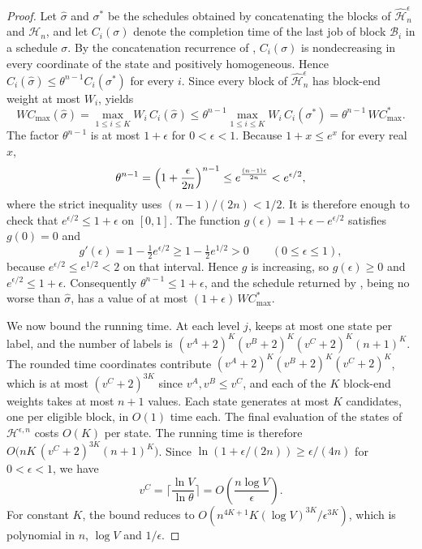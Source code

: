 \documentclass[12pt]{article}
\begin{document}
\begin{sloppypar}
\begin{proof}
Let $\hat\sigma$ and $\sigma^{*}$ be the schedules obtained by concatenating the blocks of
$\hat{\mathscr{H}}^{\epsilon}_{n}$ and $\mathscr{H}_{n}$, and let $C_i(\sigma)$ denote the completion
time of the last job of block $\mathcal{B}_i$ in a schedule $\sigma$. By the concatenation
recurrence of , $C_i(\sigma)$ is nondecreasing in every coordinate
of the state and positively homogeneous. Hence $C_i(\hat\sigma)\le\theta^{n-1}C_i(\sigma^{*})$ for
every $i$. Since every block of $\hat{\mathscr{H}}^{\epsilon}_{n}$ has block-end weight at most
$W_i$,  yields
\[
W C_{\max}(\hat\sigma)
=\max_{1\le i\le K}W_i\,C_i(\hat\sigma)
\le \theta^{n-1}\max_{1\le i\le K}W_i\,C_i(\sigma^{*})
=\theta^{n-1}\,W C_{\max}^{*}.
\]
The factor $\theta^{n-1}$ is at most $1+\epsilon$ for $0<\epsilon<1$. Because $1+x\le e^{x}$ for
every real $x$,
\[
\theta^{n-1}=\Bigl(1+\frac{\epsilon}{2n}\Bigr)^{n-1}
\le e^{\frac{(n-1)\epsilon}{2n}}
<e^{\epsilon/2},
\]
where the strict inequality uses $(n-1)/(2n)<1/2$. It is therefore enough to check that
$e^{\epsilon/2}\le1+\epsilon$ on $[0,1]$. The function $g(\epsilon)=1+\epsilon-e^{\epsilon/2}$
satisfies $g(0)=0$ and
\[
g'(\epsilon)=1-\tfrac12 e^{\epsilon/2}\ge 1-\tfrac12 e^{1/2}>0
\qquad(0\le\epsilon\le1),
\]
because $e^{\epsilon/2}\le e^{1/2}<2$ on that interval. Hence $g$ is increasing, so
$g(\epsilon)\ge0$ and $e^{\epsilon/2}\le1+\epsilon$. Consequently $\theta^{n-1}\le1+\epsilon$, and
the schedule returned by , being no worse than $\hat\sigma$, has a value of
at most $(1+\epsilon)\,W C_{\max}^{*}$.

We now bound the running time. At each level $j$,  keeps at most one state
per label, and the number of labels is $(v^{A}+2)^K(v^{B}+2)^K(v^{C}+2)^K(n+1)^K$. The rounded time
coordinates contribute $(v^{A}+2)^K(v^{B}+2)^K(v^{C}+2)^K$, which is at most $(v^{C}+2)^{3K}$ since
$v^{A},v^{B}\le v^{C}$, and each of the $K$ block-end weights takes at most $n+1$ values. Each
state generates at most $K$ candidates, one per eligible block, in $O(1)$ time each. The final
evaluation of the states of $\mathscr{H}^{\epsilon,n}$ costs $O(K)$ per state. The running time is
therefore $O\bigl(nK\,(v^{C}+2)^{3K}(n+1)^{K}\bigr)$. Since
$\ln(1+\epsilon/(2n))\ge\epsilon/(4n)$ for $0<\epsilon<1$, we have
\[
v^{C}=\Big\lceil\frac{\ln V}{\ln\theta}\Big\rceil
=O\!\left(\frac{n\log V}{\epsilon}\right).
\]
For constant $K$, the bound reduces to
$O(n^{4K+1}K(\log V)^{3K}/\epsilon^{3K})$, which is polynomial in $n$, $\log V$ and $1/\epsilon$.
\end{proof}


\end{sloppypar}
\end{document}

